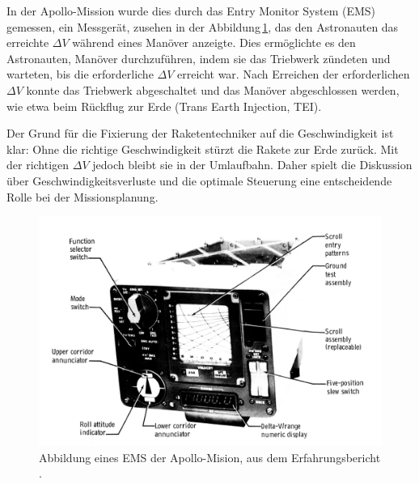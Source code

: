 In der Apollo-Mission wurde dies durch das Entry Monitor System (EMS) gemessen, ein Messgerät, zusehen in der Abbildung\,\ref{fig:leo:ems}, das den Astronauten das erreichte \(\Delta V\) während eines Manöver anzeigte. 
Dies ermöglichte es den Astronauten, Manöver durchzuführen, indem sie das Triebwerk zündeten und warteten, bis die erforderliche \(\Delta V\) erreicht war. 
Nach Erreichen der erforderlichen \(\Delta V\) konnte das Triebwerk abgeschaltet und das Manöver abgeschlossen werden, wie etwa beim Rückflug zur Erde (Trans Earth Injection, TEI).

Der Grund für die Fixierung der Raketentechniker auf die Geschwindigkeit ist klar: Ohne die richtige Geschwindigkeit stürzt die Rakete zur Erde zurück. 
Mit der richtigen \(\Delta V\) jedoch bleibt sie in der Umlaufbahn. Daher spielt die Diskussion über Geschwindigkeitsverluste und die optimale Steuerung eine entscheidende Rolle bei der Missionsplanung.


\begin{figure}
	\centering
	\includegraphics[width=\linewidth]{papers/leo/Grafiken/EMS.png}
	\caption{Abbildung eines EMS der Apollo-Mision, aus dem Erfahrungsbericht \cite{leo:wilson1976apollo}.}
	\label{fig:leo:ems}
\end{figure}


